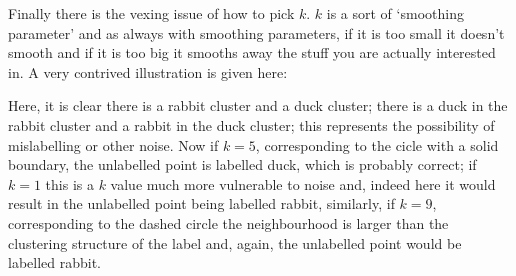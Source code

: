 \documentclass[12pt]{article}
\begin{document}
Finally there is the vexing issue of how to pick $k$. $k$ is a sort of
`smoothing parameter' and as always with smoothing parameters, if it
is too small it doesn't smooth and if it is too big it smooths away
the stuff you are actually interested in. A very contrived
illustration is given here:
\begin{center}
\end{center}
Here, it is clear there is a rabbit cluster and a duck cluster; there
is a duck in the rabbit cluster and a rabbit in the duck cluster; this
represents the possibility of mislabelling or other noise. Now if
$k=5$, corresponding to the cicle with a solid boundary, the
unlabelled point is labelled duck, which is probably correct; if $k=1$
this is a $k$ value much more vulnerable to noise and, indeed here it
would result in the unlabelled point being labelled rabbit, similarly,
if $k=9$, corresponding to the dashed circle the neighbourhood is
larger than the clustering structure of the label and, again, the
unlabelled point would be labelled rabbit.
\end{document}
